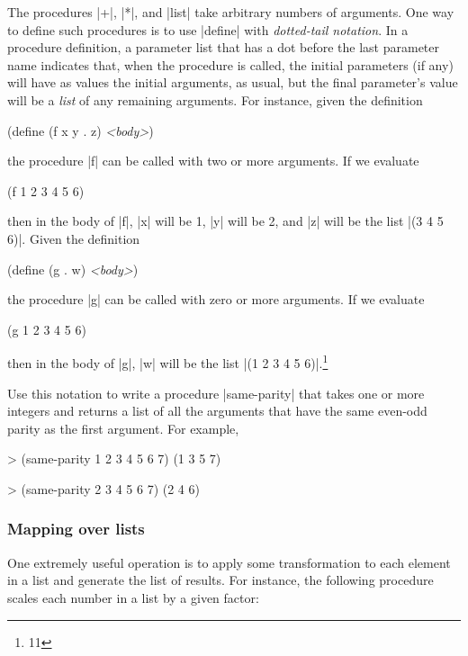 \begin{Exercise}
\label{exc:2.20}
The procedures \scheme|+|, \scheme|*|, and \scheme|list| take
arbitrary numbers of arguments. One way to define such procedures is
to use \scheme|define| with \textit{dotted-tail notation}.  In a
procedure definition, a parameter list that has a dot before the last
parameter name indicates that, when the procedure is called, the
initial parameters (if any) will have as values the initial arguments,
as usual, but the final parameter's value will be a \textit{list} of
any remaining arguments.  For instance, given the definition

\begin{schemedisplay}
(define (f x y . z) \textit{<body>})
\end{schemedisplay}
the procedure \scheme|f| can be called with two or more arguments.
If we evaluate

\begin{schemedisplay}
(f 1 2 3 4 5 6)
\end{schemedisplay}
then in the body of \scheme|f|, \scheme|x| will be 1, \scheme|y| will be
2, and \scheme|z| will be the list \scheme|(3 4 5 6)|.
Given the definition

\begin{schemedisplay}
(define (g . w) \textit{<body>})
\end{schemedisplay}
the procedure \scheme|g| can be called with zero or more arguments.
If we evaluate

\begin{schemedisplay}
(g 1 2 3 4 5 6)
\end{schemedisplay}
then in the body of \scheme|g|, \scheme|w| will be the
list \scheme|(1 2 3 4 5 6)|.\footnote{11}

Use this notation
to write a procedure \scheme|same-parity| that takes one or more integers
and returns a list of all the arguments that have the same even-odd
parity as the first argument.  For example,
\begin{schemedisplay}
> (same-parity 1 2 3 4 5 6 7)
(1 3 5 7)

> (same-parity 2 3 4 5 6 7)
(2 4 6)
\end{schemedisplay}
\end{Exercise}


\subsubsection*{Mapping over lists}


One extremely useful operation is to apply some transformation
to each element in a list and generate the list of results.
For instance, the following procedure scales each number in a list by
a given factor:

